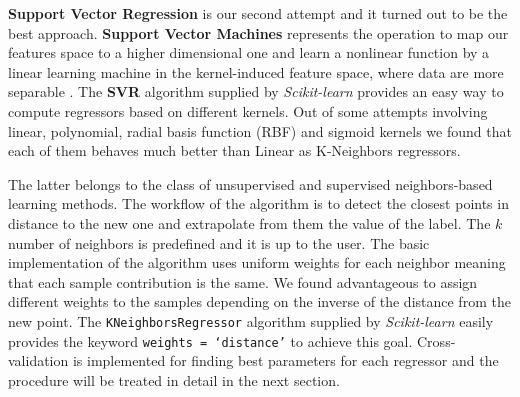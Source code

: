 \textbf{Support Vector Regression} is our second attempt and it turned out to be the best approach.
\textbf{Support Vector Machines} represents the operation to map our features space to a higher dimensional one and learn a nonlinear function by a linear learning machine in the kernel-induced feature space, where data are more separable \cite{yang2008regression}.
The \textbf{SVR} algorithm supplied by \textit{Scikit-learn} provides an easy way to compute regressors based on different kernels.
Out of some attempts involving linear, polynomial, radial basis function (RBF) and sigmoid kernels we found that each of them behaves much better than Linear as K-Neighbors regressors.

The latter belongs to the class of unsupervised and supervised neighbors-based learning methods.
The workflow of the algorithm is to detect the closest points in distance to the new one and extrapolate from them the value of the label.
The $k$ number of neighbors is predefined and it is up to the user.
The basic implementation of the algorithm uses uniform weights for each neighbor meaning that each sample contribution is the same.
We found advantageous to assign different weights to the samples depending on the inverse of the distance from the new point.
The \texttt{KNeighborsRegressor} algorithm supplied by \textit{Scikit-learn} easily provides the keyword \texttt{weights = `distance'} to achieve this goal.
Cross-validation is implemented for finding best parameters for each regressor and the procedure will be treated in detail in the next section.
